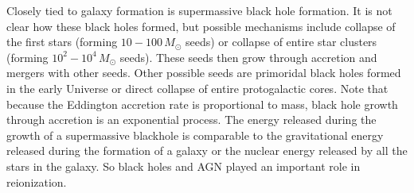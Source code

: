Closely tied to galaxy formation is supermassive black hole formation.  It is 
not clear how these black holes formed, but possible mechanisms include 
collapse of the first stars (forming $10-100\,M_{\odot}$ seeds) or collapse of 
entire star clusters (forming $10^2-10^4\,M_{\odot}$ seeds).  These 
seeds then grow through accretion and mergers with other seeds.  Other 
possible seeds are primoridal black holes formed in the early Universe or 
direct collapse of entire protogalactic cores.  Note that because the 
Eddington accretion rate is proportional to mass, black hole growth through 
accretion is an exponential process.  The energy released during the 
growth of a supermassive blackhole is comparable to the gravitational 
energy released during the formation of a galaxy or the nuclear energy 
released by all the stars in the galaxy.  So black holes and AGN played an 
important role in reionization.  



